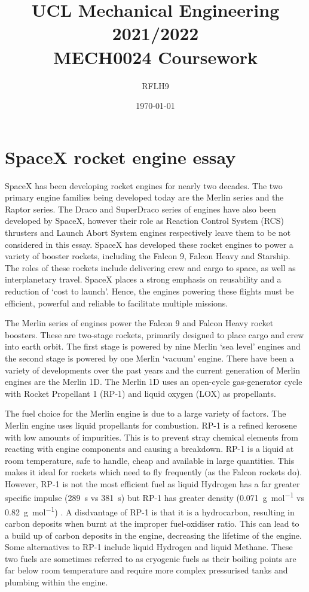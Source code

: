 \documentclass[11pt]{article}
\numberwithin{equation}{section}
\begin{document}
\title{\textbf{UCL Mechanical Engineering 2021/2022}\\MECH0024 Coursework}
\author{RFLH9}
\date{\today}
\maketitle
\tableofcontents
\listoffigures
\newpage
\part{SpaceX rocket engine essay}
SpaceX has been developing rocket engines for nearly two decades. The two primary engine families being developed today are the Merlin series and the Raptor series. The Draco and SuperDraco series of engines have also been developed by SpaceX, however their role as Reaction Control System (RCS) thrusters and Launch Abort System engines respectively leave them to be not considered in this essay. SpaceX has developed these rocket engines to power a variety of booster rockets, including the Falcon 9, Falcon Heavy and Starship. The roles of these rockets include delivering crew and cargo to space, as well as interplanetary travel. SpaceX places a strong emphasis on reusability and a reduction of `cost to launch'. Hence, the engines powering these flights must be efficient, powerful and reliable to facilitate multiple missions.

The Merlin series of engines power the Falcon 9 and Falcon Heavy rocket boosters. These are two-stage rockets, primarily designed to place cargo and crew into earth orbit. The first stage is powered by nine Merlin `sea level' engines and the second stage is powered by one Merlin `vacuum' engine. There have been a variety of developments over the past years and the current generation of Merlin engines are the Merlin 1D. The Merlin 1D uses an open-cycle gas-generator cycle with Rocket Propellant 1 (RP-1) and liquid oxygen (LOX) as propellants.

The fuel choice for the Merlin engine is due to a large variety of factors. The Merlin engine uses liquid propellants for combustion. RP-1 is a refined kerosene with low amounts of impurities. This is to prevent stray chemical elements from reacting with engine components and causing a breakdown. RP-1 is a liquid at room temperature, safe to handle, cheap and available in large quantities. This makes it ideal for rockets which need to fly frequently (as the Falcon rockets do). However, RP-1 is not the most efficient fuel as liquid Hydrogen has a far greater specific impulse (\SI{289}{\second} vs \SI{381}{\second}) but RP-1 has greater density (\SI{0.071}{\gram\per\mol} vs \SI{0.82}{\gram\per\mol}) \cite{b1}. A disdvantage of RP-1 is that it is a hydrocarbon, resulting in carbon deposits when burnt at the improper fuel-oxidiser ratio. This can lead to a build up of carbon deposits in the engine, decreasing the lifetime of the engine. Some alternatives to RP-1 include liquid Hydrogen and liquid Methane. These two fuels are sometimes referred to as cryogenic fuels as their boiling points are far below room temperature and require more complex pressurised tanks and plumbing within the engine.
\end{document}
